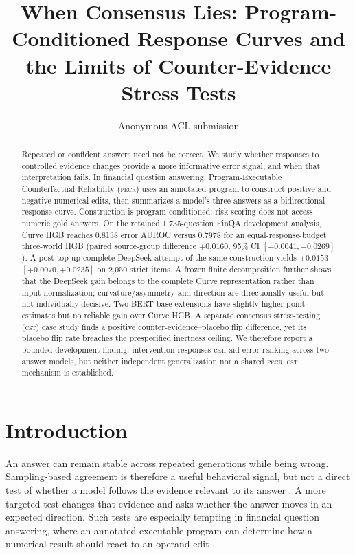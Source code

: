 \documentclass[11pt]{article}
\title{When Consensus Lies: Program-Conditioned Response Curves and the Limits of Counter-Evidence Stress Tests}
\author{Anonymous ACL submission}
\newcommand{\PECR}{\textsc{pecr}}
\newcommand{\CST}{\textsc{cst}}
\begin{document}
\maketitle

\begin{abstract}
Repeated or confident answers need not be correct. We study whether responses to controlled evidence changes provide a more informative error signal, and when that interpretation fails. In financial question answering, Program-Executable Counterfactual Reliability (\PECR{}) uses an annotated program to construct positive and negative numerical edits, then summarizes a model's three answers as a bidirectional response curve. Construction is program-conditioned; risk scoring does not access numeric gold answers. On the retained 1,735-question FinQA development analysis, Curve HGB reaches 0.8138 error AUROC versus 0.7978 for an equal-response-budget three-world HGB (paired source-group difference $+0.0160$, 95\% CI $[+0.0041,+0.0269]$). A post-top-up complete DeepSeek attempt of the same construction yields $+0.0153$ $[+0.0070,+0.0235]$ on 2,050 strict items. A frozen finite decomposition further shows that the DeepSeek gain belongs to the complete Curve representation rather than input normalization; curvature/asymmetry and direction are directionally useful but not individually decisive. Two BERT-base extensions have slightly higher point estimates but no reliable gain over Curve HGB. A separate consensus stress-testing (\CST{}) case study finds a positive counter-evidence--placebo flip difference, yet its placebo flip rate breaches the prespecified inertness ceiling. We therefore report a bounded development finding: intervention responses can aid error ranking across two answer models, but neither independent generalization nor a shared \PECR{}--\CST{} mechanism is established.
\end{abstract}

\section{Introduction}
An answer can remain stable across repeated generations while being wrong. Sampling-based agreement is therefore a useful behavioral signal, but not a direct test of whether a model follows the evidence relevant to its answer \citep{manakul-etal-2023-selfcheckgpt}. A more targeted test changes that evidence and asks whether the answer moves in an expected direction. Such tests are especially tempting in financial question answering, where an annotated executable program can determine how a numerical result should react to an operand edit \citep{chen-etal-2021-finqa}.
\end{document}

